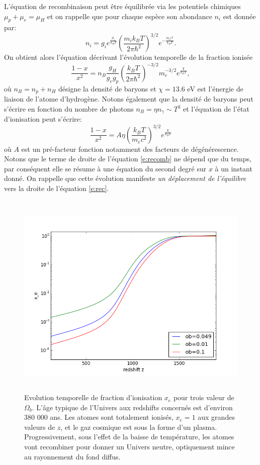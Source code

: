 L'équation de recombinaison peut être équilibrée via les potentiels chimiques $\mu_p+ \mu_e =\mu_H$ et on rappelle que pour chaque espèce son abondance $n_i$ est donnée par:
\begin{equation}
n_i=g_ie^{\frac{\mu_i}{k_BT}}\left(\frac{m_i k_B T}{2\pi\hbar^2}\right)^{3/2}e^{-\frac{m_i c^2}{k_B T}}.
\end{equation}
On obtient alors l'équation décrivant l'évolution temporelle de la fraction ionisée 
\begin{equation}
\frac{1-x}{x^2}=n_B \frac{g_H}{g_e g_p} \left(\frac{k_B T}{2\pi\hbar^2}\right)^{-3/2} m_e^{-3/2} e^{\frac{\chi}{k_B T}},
\end{equation}
où $n_B=n_p + n_H$ désigne la densité de baryons et $\chi=13.6$ eV est l'énergie de liaison de l'atome d'hydrogène. Notons également que la densité de baryons peut s'écrire en fonction du nombre de photons $n_B=\eta n_\gamma\sim T^3$ et l'équation de l'état d'ionisation peut s'écrire:
\begin{equation}
\frac{1-x}{x^2}=A \eta \left(\frac{k_B T}{m_e c^2}\right)^{3/2}e^{\frac{\chi}{k_B T}}
\label{e:recomb}
\end{equation}
où $A$ est un pré-facteur fonction notamment des facteurs de dégénérescence. Notons que le terme de droite de l'équation \ref{e:recomb} ne dépend que du temps, par conséquent elle se résume à une équation du second degré sur $x$ à un instant donné. On rappelle que cette évolution manifeste \textit{un déplacement de l'équilibre} vers  la droite de l'équation \ref{e:rec}.
\begin{figure}[htbp]
	\centering
		\includegraphics[height=10cm]{figs/recom.png}
		\caption{Evolution temporelle de fraction d'ionisation $x_e$ pour trois valeur de $\Omega_b$. L'âge typique de l'Univers aux redshifts concernés est d'environ 380 000 ans. Les atomes sont totalement ionisés, $x_e=1$ aux grandes valeurs de $z$, et le gaz cosmique est sous la forme d'un plasma. Progressivement, sous l'effet de la baisse de température, les atomes vont recombiner pour donner un Univers neutre, optiquement mince au rayonnement du fond diffus.}
	\label{f:recomb}
\end{figure}

